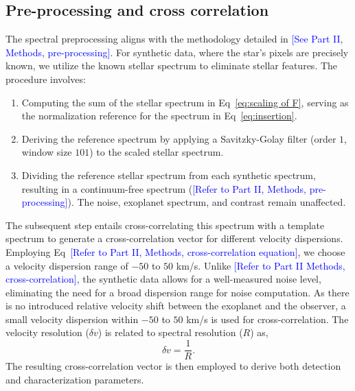 \subsection{Pre-processing and cross correlation}

The spectral preprocessing aligns with the methodology detailed in \textcolor{blue}{[See Part II, Methods, pre-processing]}. For synthetic data, where the star's pixels are precisely known, we utilize the known stellar spectrum to eliminate stellar features. The procedure involves:
\begin{enumerate}
    \item 
    Computing the sum of the stellar spectrum in Eq~\ref{eq:scaling of F}, serving as the normalization reference for the spectrum in Eq~\ref{eq:insertion}.
    \item
    Deriving the reference spectrum by applying a Savitzky-Golay filter (order $1$, window size $101$) to the scaled stellar spectrum.
    \item 
    Dividing the reference stellar spectrum from each synthetic spectrum, resulting in a continuum-free spectrum (\textcolor{blue}{[Refer to Part II, Methods, pre-processing]}). The noise, exoplanet spectrum, and contrast remain unaffected.
\end{enumerate}
The subsequent step entails cross-correlating this spectrum with a template spectrum to generate a cross-correlation vector for different velocity dispersions. Employing Eq~\textcolor{blue}{[Refer to Part II, Methods, cross-correlation equation]}, we choose a velocity dispersion range of $-50$ to $50$ km/s. Unlike \textcolor{blue}{[Refer to Part II Methods, cross-correlation]}, the synthetic data allows for a well-measured noise level, eliminating the need for a broad dispersion range for noise computation. As there is no introduced relative velocity shift between the exoplanet and the observer, a small velocity dispersion within $-50$ to $50$ km/s is used for cross-correlation. The velocity resolution ($\delta v$) is related to spectral resolution ($R$) as,
\begin{equation}
\delta v = \dfrac{1}{R}. 
\end{equation}
The resulting cross-correlation vector is then employed to derive both detection and characterization parameters.
    

